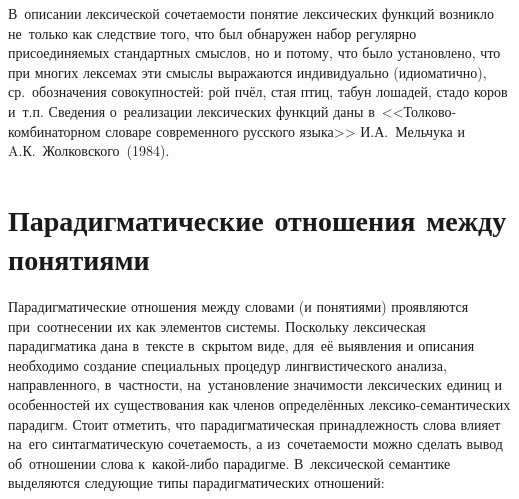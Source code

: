 \documentclass[12pt]{article}
\theoremstyle{definition}
\theoremstyle{remark}
\numberwithin{equation}{section}
\begin{document}
В~описании лексической сочетаемости понятие лексических функций
возникло не~только как следствие того, что был обнаружен набор
регулярно присоединяемых стандартных смыслов, но и потому, что
было установлено, что при многих лексемах эти смыслы выражаются
индивидуально (идиоматично), ср.~обозначения совокупностей:
рой пчёл, стая птиц, табун лошадей, стадо коров и~т.п. Сведения
о~реализации лексических функций даны в~<<Толково-комбинаторном
словаре современного русского языка>> И.А.~Мельчука и
A.К.~Жолковского~(1984).

\section{Парадигматические отношения между понятиями}
Парадигматические отношения между словами (и понятиями) проявляются
при~соотнесении их как элементов системы. Поскольку лексическая
парадигматика дана в~тексте в~скрытом виде, для~её выявления
и описания необходимо создание специальных процедур лингвистического
анализа, направленного, в~частности, на~установление значимости
лексических единиц и особенностей их существования как членов
определённых лексико-семантических парадигм. Стоит отметить, что
парадигматическая принадлежность слова влияет на~его синтагматическую
сочетаемость, а из~сочетаемости можно сделать вывод об~отношении
слова к~какой-либо парадигме. В~лексической семантике выделяются
следующие типы парадигматических отношений:
\end{document}
